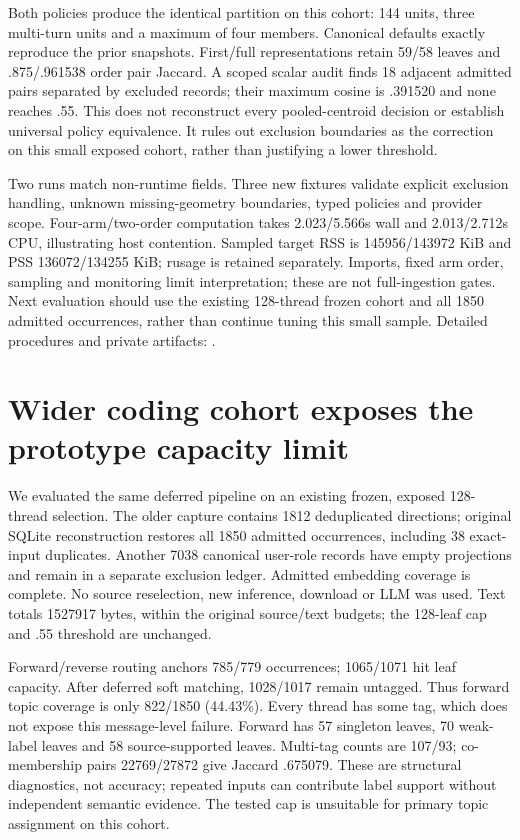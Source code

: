 \documentclass[11pt]{article}
\begin{document}
Both policies produce the identical partition on this cohort: 144 units,
three multi-turn units and a maximum of four members. Canonical defaults
exactly reproduce the prior snapshots. First/full representations retain
59/58 leaves and .875/.961538 order pair Jaccard. A scoped scalar audit finds
18 adjacent admitted pairs separated by excluded records; their maximum
cosine is .391520 and none reaches .55. This does not reconstruct every
pooled-centroid decision or establish universal policy equivalence. It rules
out exclusion boundaries as the correction on this small exposed cohort,
rather than justifying a lower threshold.

Two runs match non-runtime fields. Three new fixtures validate explicit
exclusion handling, unknown missing-geometry boundaries, typed policies and
provider scope. Four-arm/two-order computation takes 2.023/5.566s wall and
2.013/2.712s CPU, illustrating host contention. Sampled target RSS is
145956/143972 KiB and PSS 136072/134255 KiB; rusage is retained separately.
Imports, fixed arm order, sampling and monitoring limit interpretation;
these are not full-ingestion gates. Next evaluation should use the existing
128-thread frozen cohort and all 1850 admitted occurrences, rather than
continue tuning this small sample. Detailed procedures and private artifacts:
.

\section{Wider coding cohort exposes the prototype capacity limit}
We evaluated the same deferred pipeline on an existing frozen, exposed
128-thread selection. The older capture contains 1812 deduplicated directions;
original SQLite reconstruction restores all 1850 admitted occurrences,
including 38 exact-input duplicates. Another 7038 canonical user-role records
have empty projections and remain in a separate exclusion ledger. Admitted
embedding coverage is complete. No source reselection, new inference, download
or LLM was used. Text totals 1527917 bytes, within the original source/text
budgets; the 128-leaf cap and .55 threshold are unchanged.

Forward/reverse routing anchors 785/779 occurrences; 1065/1071 hit leaf
capacity. After deferred soft matching, 1028/1017 remain untagged. Thus forward
topic coverage is only 822/1850 (44.43\%). Every thread has some tag, which
does not expose this message-level failure. Forward has 57 singleton leaves,
70 weak-label leaves and 58 source-supported leaves. Multi-tag counts are
107/93; co-membership pairs 22769/27872 give Jaccard .675079. These are
structural diagnostics, not accuracy; repeated inputs can contribute label
support without independent semantic evidence. The tested cap is unsuitable
for primary topic assignment on this cohort.
\end{document}
